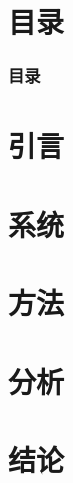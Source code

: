 \documentclass[10pt,aspectratio=43,mathserif]{beamer}
\title[NEU Beamer Theme]{\fontsize{13pt}{18pt}\selectfont {NEU Beamer Theme}}
\subtitle{\fontsize{9pt}{14pt}\selectfont \textbf{利用Beamer制作幻灯片}}
\author[林新辉]{
  林新辉, author1, author2, \\
  author3 and author4 \\\medskip
  {\small {hilinxinhui@gmail.com}} \\
  {\small {\{author1, author2\}@ncepu.edu.cn}} \\
  {\small {\{author3, author4\}@neu.edu.cn}}}
\institute[<lab>]{
  lab (lab) \\
  Northeastern University}
\date[\today]{
 \today}
\begin{document}
\begin{frame}
\titlepage
\end{frame}

\section*{目录}
\begin{frame}
    \frametitle{\textbf{目录}}
		\textbf{\tableofcontents}
\end{frame}

\section{引言}
\begin{frame}
\end{frame}

\section{系统}
\begin{frame}
\end{frame}

\section{方法}
\begin{frame}
\end{frame}

\section{分析}
\begin{frame}
\end{frame}

\section{结论}
\begin{frame}
\end{frame}

\section*{}
\begin{frame}
\end{frame}
\end{document}
